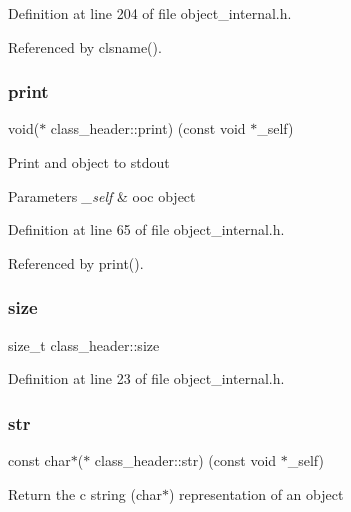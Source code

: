 Definition at line 204 of file object\+\_\+internal.\+h.



Referenced by clsname().

\mbox{\label{structclass__header_a23181c1eac1455a8f23dd9d14f8b6abd}} 
\subsubsection{\texorpdfstring{print}{print}}
{\footnotesize\ttfamily void($\ast$ class\+\_\+header\+::print) (const void $\ast$\+\_\+self)}

Print and object to stdout 
\begin{DoxyParams}{Parameters}
{\em \+\_\+self} & ooc object \\
\hline
\end{DoxyParams}


Definition at line 65 of file object\+\_\+internal.\+h.



Referenced by print().

\mbox{\label{structclass__header_a5ba6bf54fc12a2a31a2b39937cd50e84}} 
\subsubsection{\texorpdfstring{size}{size}}
{\footnotesize\ttfamily size\+\_\+t class\+\_\+header\+::size}



Definition at line 23 of file object\+\_\+internal.\+h.

\mbox{\label{structclass__header_af8a0a6de1e1eb96faab68cc58fcf84d0}} 
\subsubsection{\texorpdfstring{str}{str}}
{\footnotesize\ttfamily const char$\ast$($\ast$ class\+\_\+header\+::str) (const void $\ast$\+\_\+self)}

Return the c string (char$\ast$) representation of an object

